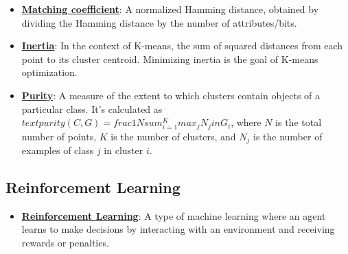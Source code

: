 \documentclass{article}%
\begin{document}
\begin{itemize}[leftmargin=*]
\item \href{https://purdue.brightspace.com/d2l/common/assets/pdfjs-d2l-dist/1.0.14-legacy/web/viewer.html?file=\%2Fcontent\%2Fenforced\%2F1095467-wl.202510.CS.24300.001\%2F12L2-distance-clusters.pdf\%3Fou\%3D1095467\&lang=en-us\&container=d2l-fileviewer-rendered-pdf\&fullscreen=d2l-fileviewer-rendered-pdf-dialog\&height=667#page=19}{\textbf{Matching coefficient}}: A normalized Hamming distance, obtained by dividing the Hamming distance by the number of attributes/bits.%
\item \href{https://purdue.brightspace.com/d2l/common/assets/pdfjs-d2l-dist/1.0.14-legacy/web/viewer.html?file=\%2Fcontent\%2Fenforced\%2F1095467-wl.202510.CS.24300.001\%2F12L2-distance-clusters.pdf\%3Fou\%3D1095467\&lang=en-us\&container=d2l-fileviewer-rendered-pdf\&fullscreen=d2l-fileviewer-rendered-pdf-dialog\&height=667#page=33}{\textbf{Inertia}}: In the context of K-means, the sum of squared distances from each point to its cluster centroid. Minimizing inertia is the goal of K-means optimization.%
\item \href{https://purdue.brightspace.com/d2l/common/assets/pdfjs-d2l-dist/1.0.14-legacy/web/viewer.html?file=\%2Fcontent\%2Fenforced\%2F1095467-wl.202510.CS.24300.001\%2F12L2-distance-clusters.pdf\%3Fou\%3D1095467\&lang=en-us\&container=d2l-fileviewer-rendered-pdf\&fullscreen=d2l-fileviewer-rendered-pdf-dialog\&height=667#page=44}{\textbf{Purity}}: A measure of the extent to which clusters contain objects of a particular class. It's calculated as $text{purity}(C, G) = frac{1}{N} sum_{i=1}^{K} max_j N_j in G_i$, where $N$ is the total number of points, $K$ is the number of clusters, and $N_j$ is the number of examples of class $j$ in cluster $i$.%
\end{itemize}

%
\subsection{Reinforcement Learning}%
\label{subsec:ReinforcementLearning}%
\begin{itemize}[leftmargin=*]%
\item \href{https://purdue.brightspace.com/d2l/common/assets/pdfjs-d2l-dist/1.0.14-legacy/web/viewer.html?file=\%2Fcontent\%2Fenforced\%2F1095467-wl.202510.CS.24300.001\%2F02L2-Intro.pdf\%3Fou\%3D1095467\&lang=en-us\&container=d2l-fileviewer-rendered-pdf\&fullscreen=d2l-fileviewer-rendered-pdf-dialog\&height=667#page=46}{\textbf{Reinforcement Learning}}: A type of machine learning where an agent learns to make decisions by interacting with an environment and receiving rewards or penalties.%
\end{itemize}
\end{document}
